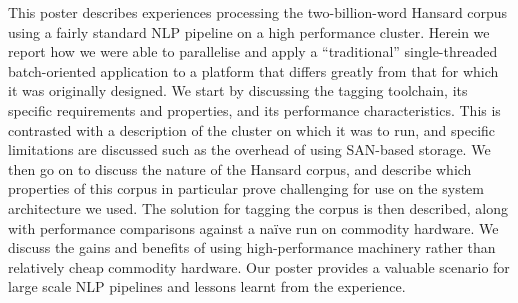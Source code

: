     This poster describes experiences processing the two-billion-word Hansard corpus using a fairly standard NLP pipeline on a high performance cluster.  Herein we report how we were able to parallelise and apply a ``traditional'' single-threaded batch-oriented application to a platform that differs greatly from that for which it was originally designed. We start by discussing the tagging toolchain, its specific requirements and properties, and its performance characteristics.  This is contrasted with a description of the cluster on which it was to run, and specific limitations are discussed such as the overhead of using SAN-based storage. We then go on to discuss the nature of the Hansard corpus, and describe which properties of this corpus in particular prove challenging for use on the system architecture we used. The solution for tagging the corpus is then described, along with performance comparisons against a na\"{i}ve run on commodity hardware.  We discuss the gains and benefits of using high-performance machinery rather than relatively cheap commodity hardware. Our poster provides a valuable scenario for large scale NLP pipelines and lessons learnt from the experience.


%
% 



